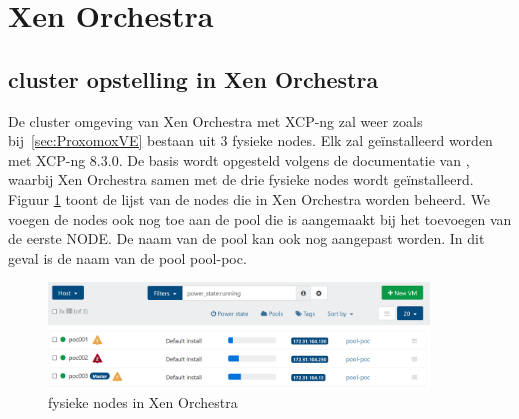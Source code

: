 \section{Xen Orchestra}%
\subsection{cluster opstelling in Xen Orchestra}
De cluster omgeving van Xen Orchestra met XCP-ng zal weer zoals bij~\ref{sec:ProxomoxVE} bestaan uit 3 fysieke nodes. Elk zal geïnstalleerd worden met XCP-ng 8.3.0.
De basis wordt opgesteld volgens de documentatie van \textcite{dick2023xcpng}, waarbij Xen Orchestra samen met de drie fysieke nodes wordt geïnstalleerd.
Figuur \ref{fig:nodes-list} toont de lijst van de nodes die in Xen Orchestra worden beheerd.
We voegen de nodes ook nog toe aan de pool die is aangemaakt bij het toevoegen van de eerste NODE. De naam van de pool kan ook nog aangepast worden. In dit geval is de naam van de pool pool-poc.
\begin{figure}[H]
  \centering
  \includegraphics[width=0.9\textwidth]{../poc/nodes-orch.png}
  \caption{fysieke nodes in Xen Orchestra}
  \label{fig:nodes-list}
\end{figure}

